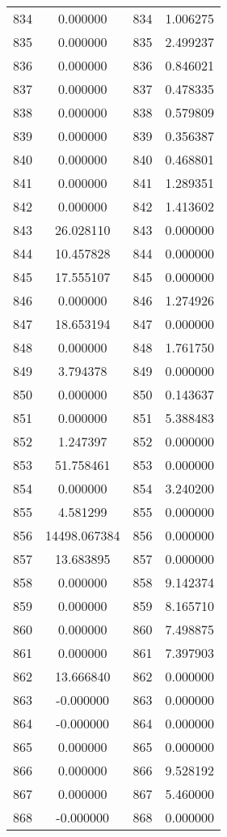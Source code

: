 \documentclass[12pt]{article}
\begin{document}
\begin{longtable}{@{}cccc@{}}
834 & 0.000000 & 834 & 1.006275 \\
835 & 0.000000 & 835 & 2.499237 \\
836 & 0.000000 & 836 & 0.846021 \\
837 & 0.000000 & 837 & 0.478335 \\
838 & 0.000000 & 838 & 0.579809 \\
839 & 0.000000 & 839 & 0.356387 \\
840 & 0.000000 & 840 & 0.468801 \\
841 & 0.000000 & 841 & 1.289351 \\
842 & 0.000000 & 842 & 1.413602 \\
843 & 26.028110 & 843 & 0.000000 \\
844 & 10.457828 & 844 & 0.000000 \\
845 & 17.555107 & 845 & 0.000000 \\
846 & 0.000000 & 846 & 1.274926 \\
847 & 18.653194 & 847 & 0.000000 \\
848 & 0.000000 & 848 & 1.761750 \\
849 & 3.794378 & 849 & 0.000000 \\
850 & 0.000000 & 850 & 0.143637 \\
851 & 0.000000 & 851 & 5.388483 \\
852 & 1.247397 & 852 & 0.000000 \\
853 & 51.758461 & 853 & 0.000000 \\
854 & 0.000000 & 854 & 3.240200 \\
855 & 4.581299 & 855 & 0.000000 \\
856 & 14498.067384 & 856 & 0.000000 \\
857 & 13.683895 & 857 & 0.000000 \\
858 & 0.000000 & 858 & 9.142374 \\
859 & 0.000000 & 859 & 8.165710 \\
860 & 0.000000 & 860 & 7.498875 \\
861 & 0.000000 & 861 & 7.397903 \\
862 & 13.666840 & 862 & 0.000000 \\
863 & -0.000000 & 863 & 0.000000 \\
864 & -0.000000 & 864 & 0.000000 \\
865 & 0.000000 & 865 & 0.000000 \\
866 & 0.000000 & 866 & 9.528192 \\
867 & 0.000000 & 867 & 5.460000 \\
868 & -0.000000 & 868 & 0.000000 \\

\end{longtable}
\end{document}
